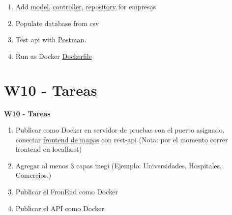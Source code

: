 \documentclass{beamer}
\begin{document}
\begin{frame}
\begin{enumerate}
\item

 Add  
    \href{https://github.com/adsoftsito/maps-api-jwt/blob/master/src/main/java/com/grokonez/jwtauthentication/model/Empresa.java}{model}, 
    \href{https://github.com/adsoftsito/maps-api-jwt/blob/master/src/main/java/com/grokonez/jwtauthentication/controller/EmpresaController.java}{controller}, 
    \href{https://github.com/adsoftsito/maps-api-jwt/blob/master/src/main/java/com/grokonez/jwtauthentication/repository/EmpresaRepository.java}{repository} for empresas

\item
    Populate database from csv
\item
    Test api with \href{https://www.postman.com/downloads/}{Postman}.	
\item
	Run as Docker \href{https://github.com/adsoftsito/ng5-api/blob/master/Dockerfile}{Dockerfile}
	 
\end{enumerate}

	


\end{frame}


\section{W10  - Tareas }

\begin{frame}


\textbf{W10  - Tareas}


\begin{enumerate}
\item
	Publicar como Docker en servidor de pruebas con el puerto asignado, conectar \href{https://github.com/adsoftsito/bigdata-maps}{frontend de mapas} con rest-api (Nota: por el momento correr frontend en localhost)

\item
	Agregar al menos 3 capas inegi (Ejemplo: Universidades, Hospitales, Comercios.)
\item
	Publicar el FronEnd como Docker
\item
	Publicar el API como Docker

\end{enumerate} 


\end{frame}
\end{document}
